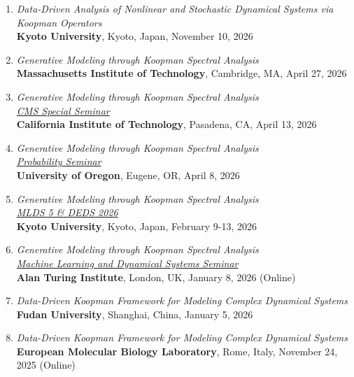 \documentclass[margin]{res}
\begin{document}
\begin{resume}
\begin{enumerate}
    \item {\sl Data-Driven Analysis of Nonlinear and Stochastic Dynamical Systems via Koopman Operators} \\
    \textbf{Kyoto University}, Kyoto, Japan, November 10, 2026
    
    \item {\sl Generative Modeling through Koopman Spectral Analysis} \\
    \textbf{Massachusetts Institute of Technology}, Cambridge, MA, April 27, 2026 
    
    \item {\sl Generative Modeling through Koopman Spectral Analysis} \\
    \href{}{\sl CMS Special Seminar} \\
    \textbf{California Institute of Technology}, Pasadena, CA, April 13, 2026

    \item {\sl Generative Modeling through Koopman Spectral Analysis} \\
    \href{https://naturalsciences.uoregon.edu/mathematics/seminars}{\sl Probability Seminar} \\
    \textbf{University of Oregon}, Eugene, OR, April 8, 2026
    
    \item {\sl Generative Modeling through Koopman Spectral Analysis} \\
    \href{https://sites.google.com/view/mlds-deds-2026}{\sl MLDS 5 \& DEDS 2026} \\
    \textbf{Kyoto University}, Kyoto, Japan, February 9-13, 2026
    
    \item {\sl Generative Modeling through Koopman Spectral Analysis} \\
    \href{https://www.youtube.com/watch?v=FDEGkddluls&t=893s}{\sl Machine Learning and Dynamical Systems Seminar} \\
    \textbf{Alan Turing Institute}, London, UK, January 8, 2026 (Online)
    
    \item {\sl Data-Driven Koopman Framework for Modeling Complex Dynamical Systems} \\
    \textbf{Fudan University}, Shanghai, China, January 5, 2026
    
    \item {\sl Data-Driven Koopman Framework for Modeling Complex Dynamical Systems} \\
    \textbf{European Molecular Biology Laboratory}, Rome, Italy, November 24, 2025 (Online)
    

\end{enumerate}
\end{resume}
\end{document}
